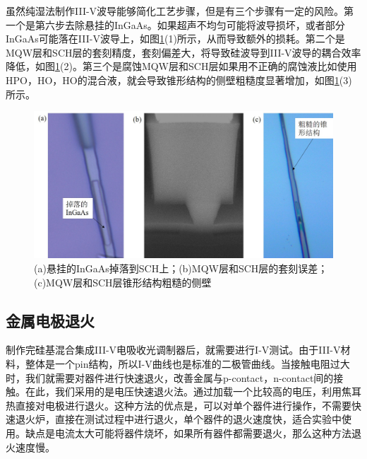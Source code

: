 虽然纯湿法制作III-V波导能够简化工艺步骤，但是有三个步骤有一定的风险。第一个是第六步去除悬挂的InGaAs。如果超声不均匀可能将波导损坏，或者部分InGaAs可能落在III-V波导上，如图\ref{chapt4_III_V_wrong_results}(1)所示，从而导致额外的损耗。第二个是MQW层和SCH层的套刻精度，套刻偏差大，将导致硅波导到III-V波导的耦合效率降低，如图\ref{chapt4_III_V_wrong_results}(2)。第三个是腐蚀MQW层和SCH层如果用不正确的腐蚀液比如使用HPO，HO，HO的混合液，就会导致锥形结构的侧壁粗糙度显著增加，如图\ref{chapt4_III_V_wrong_results}(3)所示。
\begin{figure}[htb]
	\centering
	\includegraphics[width=14cm]{./Pictures/chapt4_III_V_wrong_results.jpg}
	\caption{(a)悬挂的InGaAs掉落到SCH上；(b)MQW层和SCH层的套刻误差；(c)MQW层和SCH层锥形结构粗糙的侧壁}
	\label{chapt4_III_V_wrong_results}
\end{figure}

\subsection{金属电极退火}
制作完硅基混合集成III-V电吸收光调制器后，就需要进行I-V测试。由于III-V材料，整体是一个pin结构，所以I-V曲线也是标准的二极管曲线。当接触电阻过大时，我们就需要对器件进行快速退火，改善金属与p-contact，n-contact间的接触。在此，我们采用的是电压快速退火法。通过加载一个比较高的电压，利用焦耳热直接对电极进行退火。这种方法的优点是，可以对单个器件进行操作，不需要快速退火炉，直接在测试过程中进行退火，单个器件的退火速度快，适合实验中使用。缺点是电流太大可能将器件烧坏，如果所有器件都需要退火，那么这种方法退火速度慢。

